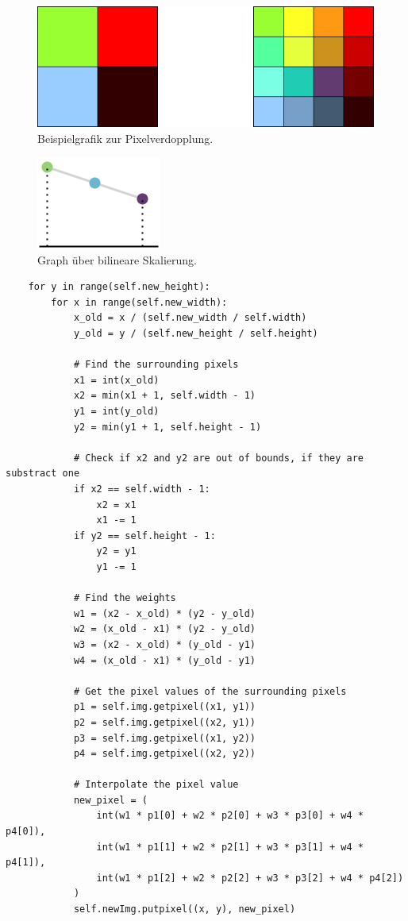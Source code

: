     
    \begin{figure}[h]
        \centering
        \includegraphics[width=\textwidth]{img/pixel_verdopplung.png}
        \caption{Beispielgrafik zur Pixelverdopplung.}
        \label{fig:my_label}
    \end{figure}
    
    \begin{figure}[h]
        \centering
        \includegraphics{img/pixel_verdopplung_graph.png}
        \caption{Graph über bilineare Skalierung.}
        \label{fig:my_label}
    \end{figure}
    
    
    \begin{lstlisting}
    for y in range(self.new_height):
        for x in range(self.new_width):
            x_old = x / (self.new_width / self.width)
            y_old = y / (self.new_height / self.height)
    
            # Find the surrounding pixels
            x1 = int(x_old)
            x2 = min(x1 + 1, self.width - 1)
            y1 = int(y_old)
            y2 = min(y1 + 1, self.height - 1)
    
            # Check if x2 and y2 are out of bounds, if they are substract one
            if x2 == self.width - 1:
                x2 = x1
                x1 -= 1
            if y2 == self.height - 1:
                y2 = y1
                y1 -= 1
    
            # Find the weights
            w1 = (x2 - x_old) * (y2 - y_old)
            w2 = (x_old - x1) * (y2 - y_old)
            w3 = (x2 - x_old) * (y_old - y1)
            w4 = (x_old - x1) * (y_old - y1)
    
            # Get the pixel values of the surrounding pixels
            p1 = self.img.getpixel((x1, y1))
            p2 = self.img.getpixel((x2, y1))
            p3 = self.img.getpixel((x1, y2))
            p4 = self.img.getpixel((x2, y2))
    
            # Interpolate the pixel value
            new_pixel = (
                int(w1 * p1[0] + w2 * p2[0] + w3 * p3[0] + w4 * p4[0]),
                int(w1 * p1[1] + w2 * p2[1] + w3 * p3[1] + w4 * p4[1]),
                int(w1 * p1[2] + w2 * p2[2] + w3 * p3[2] + w4 * p4[2])
            )
            self.newImg.putpixel((x, y), new_pixel)
    \end{lstlisting}
    
